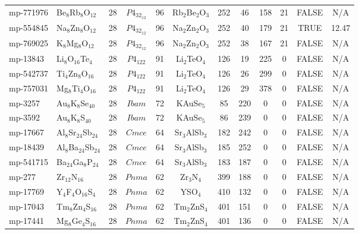 {\begin{longtable}{llcccccccccc}
    mp-771976 & Be$_{8}$Rb$_{8}$O$_{12}$ & 28    & $P4_32_12$ & 96    & Rb$_{2}$Be$_{2}$O$_{3}$ & 252   & 46    & 158   & 21    & FALSE & N/A \\
    mp-554845 & Na$_{8}$Zn$_{8}$O$_{12}$ & 28    & $P4_32_12$ & 96    & Na$_{2}$Zn$_{2}$O$_{3}$ & 252   & 40    & 179   & 21    & TRUE  & 12.47  \\
    mp-769025 & K$_{8}$Mg$_{8}$O$_{12}$ & 28    & $P4_32_12$ & 96    & Na$_{2}$Zn$_{2}$O$_{3}$ & 252   & 38    & 167   & 21    & FALSE & N/A \\
    mp-13843 & Li$_{8}$O$_{16}$Te$_{4}$ & 28    & $P4_122$ & 91    & Li$_{2}$TeO$_{4}$ & 126   & 19    & 225   & 0     & FALSE & N/A \\
    mp-542737 & Ti$_{4}$Zn$_{8}$O$_{16}$ & 28    & $P4_122$ & 91    & Li$_{2}$TeO$_{4}$ & 126   & 26    & 299   & 0     & FALSE & N/A \\
    mp-757031 & Mg$_{8}$Ti$_{4}$O$_{16}$ & 28    & $P4_122$ & 91    & Li$_{2}$TeO$_{4}$ & 126   & 29    & 378   & 0     & FALSE & N/A \\
    mp-3257 & Au$_{8}$K$_{8}$Se$_{40}$ & 28    & $Ibam$ & 72    & KAuSe$_{5}$ & 85    & 220   & 0     & 0     & FALSE & N/A \\
    mp-3592 & Au$_{8}$K$_{8}$S$_{40}$ & 28    & $Ibam$ & 72    & KAuSe$_{5}$ & 86    & 239   & 0     & 0     & FALSE & N/A \\
    mp-17667 & Al$_{8}$Sr$_{24}$Sb$_{24}$ & 28    & $Cmce$ & 64    & Sr$_{3}$AlSb$_{3}$ & 182   & 242   & 0     & 0     & FALSE & N/A \\
    mp-18439 & Al$_{8}$Ba$_{24}$Sb$_{24}$ & 28    & $Cmce$ & 64    & Sr$_{3}$AlSb$_{3}$ & 185   & 252   & 0     & 0     & FALSE & N/A \\
    mp-541715 & Ba$_{24}$Ga$_{8}$P$_{24}$ & 28    & $Cmce$ & 64    & Sr$_{3}$AlSb$_{3}$ & 183   & 187   & 0     & 0     & FALSE & N/A \\
    mp-277 & Zr$_{12}$N$_{16}$ & 28    & $Pnma$ & 62    & Zr$_{3}$N$_{4}$ & 399   & 188   & 0     & 0     & FALSE & N/A \\
    mp-17769 & Y$_{4}$F$_{4}$O$_{16}$S$_{4}$ & 28    & $Pnma$ & 62    & YSO$_{4}$ & 410   & 132   & 0     & 0     & FALSE & N/A \\
    mp-17043 & Tm$_{8}$Zn$_{4}$S$_{16}$ & 28    & $Pnma$ & 62    & Tm$_{2}$ZnS$_{4}$ & 401   & 151   & 0     & 0     & FALSE & N/A \\
    mp-17441 & Mg$_{8}$Ge$_{4}$S$_{16}$ & 28    & $Pnma$ & 62    & Tm$_{2}$ZnS$_{4}$ & 401   & 136   & 0     & 0     & FALSE & N/A \\

\end{longtable}}
